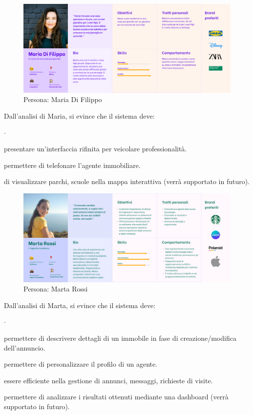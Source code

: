 \begin{figure}[h]
    \centering
    \includegraphics[width=\textwidth]{assets/personas/maria-di-filippo.png}
    \caption{Persona: Maria Di Filippo}
    \label{fig:maria-di-filippo}
\end{figure}

\noindent
Dall'analisi di Maria, si evince che il sistema deve:
\begin{list}{$\cdot$}{}
    \item presentare un'interfaccia rifinita per veicolare professionalità.
    \item permettere di telefonare l'agente immobiliare.
    \item di visualizzare parchi, scuole nella mappa interattiva (verrà supportato in futuro).
\end{list}

\begin{figure}[h]
    \centering
    \includegraphics[width=\textwidth]{assets/personas/marta-rossi.png}
    \caption{Persona: Marta Rossi}
    \label{fig:marta-rossi}
\end{figure}

\noindent
Dall'analisi di Marta, si evince che il sistema deve:
\begin{list}{$\cdot$}{}
    \item permettere di descrivere dettagli di un immobile in fase di creazione/modifica dell'annuncio.
    \item permettere di personalizzare il profilo di un agente.
    \item essere efficiente nella gestione di annunci, messaggi, richieste di visite.
    \item permettere di analizzare i risultati ottenuti mediante una dashboard (verrà supportato in futuro).
\end{list}

